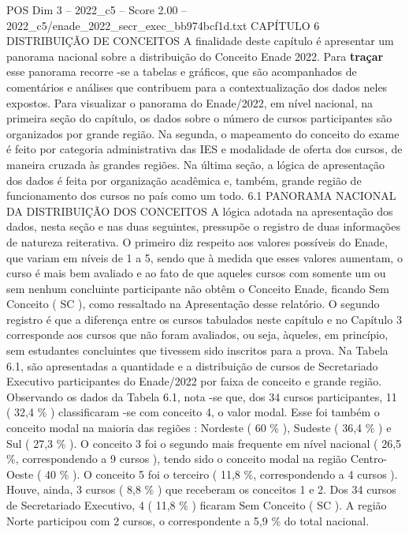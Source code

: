 \begin{textsample}{POS Dim 3 – 2022\_c5 – Score 2.00 – 2022\_c5/enade\_2022\_secr\_exec\_bb974bcf1d.txt}  \label{ex:f3_pos_070}
CAPÍTULO 6 DISTRIBUIÇÃO DE CONCEITOS A finalidade deste capítulo é apresentar um panorama nacional sobre a distribuição do Conceito Enade 2022.
Para \textbf{traçar} esse panorama recorre -se a tabelas e gráficos, que são acompanhados de comentários e análises que contribuem para a contextualização dos dados neles expostos.
Para visualizar o panorama do Enade/2022, em nível nacional, na primeira seção do capítulo, os dados sobre o número de cursos participantes são organizados por grande região.
Na segunda, o mapeamento do conceito do exame é feito por categoria administrativa das IES e modalidade de oferta dos cursos, de maneira cruzada às grandes regiões.
Na última seção, a lógica de apresentação dos dados é feita por organização acadêmica e, também, grande região de funcionamento dos cursos no país como um todo. 6.1 PANORAMA NACIONAL DA DISTRIBUIÇÃO DOS CONCEITOS A lógica adotada na apresentação dos dados, nesta seção e nas duas seguintes, pressupõe o registro de duas informações de natureza reiterativa.
O primeiro diz respeito aos valores possíveis do Enade, que variam em níveis de 1 a 5, sendo que à medida que esses valores aumentam, o curso é mais bem avaliado e ao fato de que aqueles cursos com somente um ou sem nenhum concluinte participante não obtêm o Conceito Enade, ficando Sem Conceito ( SC ), como ressaltado na Apresentação desse relatório.
O segundo registro é que a diferença entre os cursos tabulados neste capítulo e no Capítulo 3 corresponde aos cursos que não foram avaliados, ou seja, àqueles, em princípio, sem estudantes concluintes que tivessem sido inscritos para a prova.
Na Tabela 6.1, são apresentadas a quantidade e a distribuição de cursos de Secretariado Executivo participantes do Enade/2022 por faixa de conceito e grande região.
Observando os dados da Tabela 6.1, nota -se que, dos 34 cursos participantes, 11 ( 32,4 \% ) classificaram -se com conceito 4, o valor modal.
Esse foi também o conceito modal na maioria das regiões : Nordeste ( 60 \% ), Sudeste ( 36,4 \% ) e Sul ( 27,3 \% ).
O conceito 3 foi o segundo mais frequente em nível nacional ( 26,5 \%, correspondendo a 9 cursos ), tendo sido o conceito modal na região Centro-Oeste ( 40 \% ).
O conceito 5 foi o terceiro ( 11,8 \%, correspondendo a 4 cursos ).
Houve, ainda, 3 cursos ( 8,8 \% ) que receberam os conceitos 1 e 2.
Dos 34 cursos de Secretariado Executivo, 4 ( 11,8 \% ) ficaram Sem Conceito ( SC ).
A região Norte participou com 2 cursos, o correspondente a 5,9 \% do total nacional.

\end{textsample}
